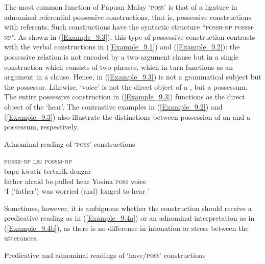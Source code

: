 The most common function of Papuan Malay  ‘\textsc{poss}’ is that of a ligature in adnominal referential possessive constructions, that is, possessive constructions with  referents. Such constructions have the syntactic structure ``\textsc{possr-np}  \textsc{possm-np}''. As shown in (\ref{Example_9.3}), this type of possessive construction contrasts with the verbal constructions in (\ref{Example_9.1}) and (\ref{Example_9.2}): the possessive relation is not encoded by a two-argument clause but in a single construction which consists of two  phrases, which in turn functions as an argument in a clause. Hence,  in (\ref{Example_9.3}) is not a grammatical subject but the possessor. Likewise,  ‘voice’ is not the direct object of a , but a  possessum. The entire possessive construction in (\ref{Example_9.3}) functions as the direct object of the    ‘hear’. The contrastive examples in (\ref{Example_9.2}) and (\ref{Example_9.3}) also illustrate the distinctions between possession of an  and a  possessum, respectively.



\begin{styleExampleTitle}
Adnominal reading of  ‘\textsc{poss}’ constructions
\end{styleExampleTitle}

\ea
\label{Example_9.3}
\glll {} {} {} {} \textup{\textsc{possr-np}}  \textup{\textsc{lig}}   \textup{\textsc{possm-np}}\\ %
 {bapa}  {kwatir}  {tertarik}  {dengar}  {}  {}  {}\\
 {father}  {afraid}  {be.pulled}  {hear}  {Yosina}  {\textsc{poss}}  {voice}\\
\glt 
‘I (‘father’) was worried (and) longed to hear ’ \textstyleExampleSource{[080922-001a-CvPh.0205]}
\z



Sometimes, however, it is ambiguous whether the  construction should receive a predicative reading as in (\ref{Example_9.4a}) or an adnominal interpretation as in (\ref{Example_9.4b}), as there is no difference in intonation or stress between the utterances.



\begin{styleExampleTitle}
Predicative and adnominal readings of  ‘have/\textsc{poss}’ constructions
\end{styleExampleTitle}


